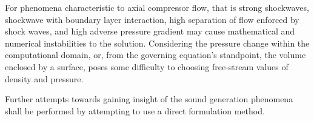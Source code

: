 For phenomena characteristic to axial compressor flow, that is strong shockwaves, shockwave with boundary layer interaction, high separation of flow enforced by shock waves, and high adverse pressure gradient may cause mathematical and numerical instabilities to the solution. Considering the pressure change within the computational domain, or, from the governing equation's standpoint, the volume enclosed by a surface, poses some difficulty to choosing free-stream values of density and pressure.

Further attempts towards gaining insight of the sound generation phenomena shall be performed by attempting to use a direct formulation method.